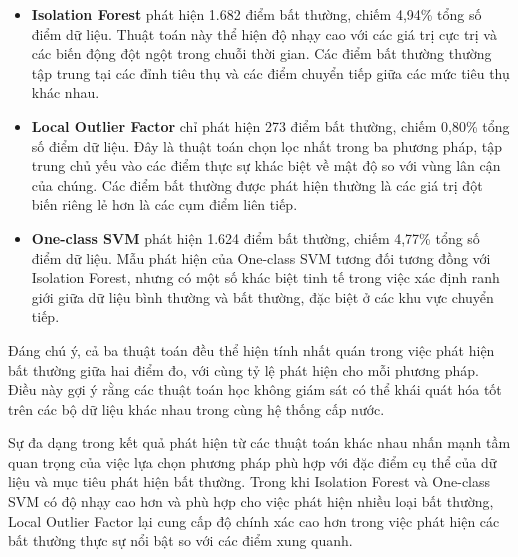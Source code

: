 \begin{itemize}
    \item \textbf{Isolation Forest} phát hiện 1.682 điểm bất thường, chiếm 4,94\% tổng số điểm dữ liệu. Thuật toán này thể hiện độ nhạy cao với các giá trị cực trị và các biến động đột ngột trong chuỗi thời gian. Các điểm bất thường thường tập trung tại các đỉnh tiêu thụ và các điểm chuyển tiếp giữa các mức tiêu thụ khác nhau.
    
    \item \textbf{Local Outlier Factor} chỉ phát hiện 273 điểm bất thường, chiếm 0,80\% tổng số điểm dữ liệu. Đây là thuật toán chọn lọc nhất trong ba phương pháp, tập trung chủ yếu vào các điểm thực sự khác biệt về mật độ so với vùng lân cận của chúng. Các điểm bất thường được phát hiện thường là các giá trị đột biến riêng lẻ hơn là các cụm điểm liên tiếp.
    
    \item \textbf{One-class SVM} phát hiện 1.624 điểm bất thường, chiếm 4,77\% tổng số điểm dữ liệu. Mẫu phát hiện của One-class SVM tương đối tương đồng với Isolation Forest, nhưng có một số khác biệt tinh tế trong việc xác định ranh giới giữa dữ liệu bình thường và bất thường, đặc biệt ở các khu vực chuyển tiếp.
\end{itemize}

Đáng chú ý, cả ba thuật toán đều thể hiện tính nhất quán trong việc phát hiện bất thường giữa hai điểm đo, với cùng tỷ lệ phát hiện cho mỗi phương pháp. Điều này gợi ý rằng các thuật toán học không giám sát có thể khái quát hóa tốt trên các bộ dữ liệu khác nhau trong cùng hệ thống cấp nước.

Sự đa dạng trong kết quả phát hiện từ các thuật toán khác nhau nhấn mạnh tầm quan trọng của việc lựa chọn phương pháp phù hợp với đặc điểm cụ thể của dữ liệu và mục tiêu phát hiện bất thường. Trong khi Isolation Forest và One-class SVM có độ nhạy cao hơn và phù hợp cho việc phát hiện nhiều loại bất thường, Local Outlier Factor lại cung cấp độ chính xác cao hơn trong việc phát hiện các bất thường thực sự nổi bật so với các điểm xung quanh.
